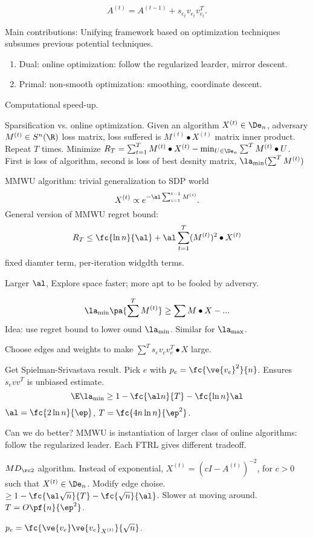 \[
A^{(t)}=A^{(t-1)}+s_{e_t}v_{e_t}v_{e_t}^T.
\]

Main contributions: Unifying framework based on optimization techniques subsumes previous potential techniques. 
\begin{enumerate}
\item
Dual: online optimization: follow the regularized learder, mirror descent.
\item
Primal: non-smooth optimization: smoothing, coordinate descent.
\end{enumerate}

Computational speed-up.

Sparsification vs. online optimization.
Given an algorithm $X^{(t)}\in \De_n$, adversary $M^{(t)}\in S^n(\R)$ loss matrix, loss suffered is $M^{(t)}\bullet X^{(t)}$ matrix inner product. Repeat $T$ times. Minimize $R_T=\sum_{t=1}^T M^{(t)}\bullet X^{(t)}-\min_{U\in \De_n}\sum^T M^{(t)}\bullet U$.
First is loss of algorithm, second is loss of best desnity matrix, $\la_{\min}(\sum^T M^{(t)})$

MMWU algorithm: trivial generalization to SDP world
\[
X^{(t)} \propto e^{-\al\sum_{i=1}^{t-1} M^{(i)}}.
\]
General version of MMWU regret bound: 
\[
R_T\le \fc{\ln n}{\al}+\al\sum_{t=1}^T (M^{(t)})^2\bullet X^{(t)}
\]
fixed diamter term, per-iteration widgdth terms.

Larger $\al$, Explore space faster; more apt to be fooled by adversry.


\[
\la_{\min}\pa{\sum^T M^{(t)}} \ge \sum M\bullet X- ...
\]
Idea: use regret bound to lower ound $\la_{\min}$. Similar for $\la_{\max}$. 

Choose edges and weights to make $\sum^T s_ev_ev_e^T\bullet X$ large.

Get Spielman-Srivastava result. Pick $e$ with $p_e=\fc{\ve{v_e}^2}{n}$. Ensures $s_evv^T$ is unbiased estimate.
\[
\E\la_{\min}\ge 1-\fc{\al n}{T}-\fc{\ln n}\al
\]
$\al=\fc{2\ln n}{\ep}$, $T=\fc{4n\ln n}{\ep^2}$. 


Can we do better? MMWU is instantiation of larger class of online algorithms: follow the regularized leader. Each FTRL gives different tradeoff.

$MD_{\rc2}$ algorithm. Instead of exponential, $X^{(t)}=(cI-A^{(t)})^{-2}$, for $c>0$ such that $X^{(t)}\in \De_n$. Modify edge choise. $\ge 1-\fc{\al\sqrt n}{T}-\fc{\sqrt n}{\al}$. Slower at moving around. $T=O\pf{n}{\ep^2}$. 

$p_e=\fc{\ve{v_e}\ve{v_e}_{X^{(t)}}}{\sqrt n}$. %

